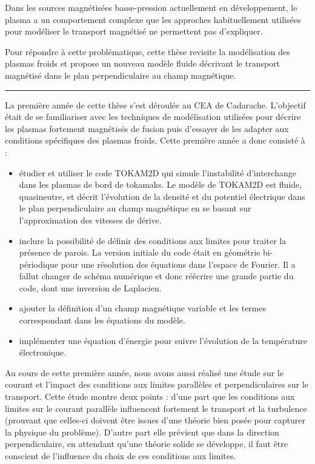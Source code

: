 Dans les sources magnétisées basse-pression actuellement en
développement, le plasma a un comportement complexe que les
approches habituellement utilisées pour modéliser le transport
magnétisé ne permettent pas d'expliquer.

Pour répondre à cette problématique, cette thèse revisite la modélisation
des plasmas froids et propose un nouveau modèle fluide décrivant le transport
magnétisé dans le plan perpendiculaire au champ magnétique.

\begin{center}
\rule{0.6\textwidth}{1pt}
\end{center}

La première année de cette thèse s'est déroulée au CEA de Cadarache.
L'objectif était de se familiariser avec les techniques de modélisation
utilisées pour décrire les plasmas fortement magnétisés de fusion puis d'essayer
de les adapter aux conditions spécifiques des plasmas froids. Cette première
année a donc consisté à :

\begin{itemize}
  \item étudier et utiliser le code TOKAM2D qui simule
  l'instabilité d'interchange dans les plasmas de bord de tokamaks. Le 
  modèle de TOKAM2D est fluide, quasineutre, et décrit l'évolution de la
  densité et du potentiel électrique dans le plan perpendiculaire au champ
  magnétique en se basant sur l'approximation des vitesses de dérive.
  \item inclure la possibilité de définir des conditions aux limites pour
  traiter la présence de parois.
  La version initiale du code était en géométrie bi-périodique pour une résolution des
  équations dans l'espace de Fourier. Il a fallut changer de schéma
  numérique et donc réécrire une grande partie du code, dont une inversion de
  Laplacien.
  \item ajouter la définition d'un champ magnétique
  variable et les termes correspondant dans les équations du modèle.
  \item implémenter une équation d'énergie pour suivre l'évolution de la
  température électronique.
\end{itemize} 
 
 Au cours de cette première année, nous avons aussi réalisé une étude sur le
 courant et l'impact des conditions aux limites parallèles et perpendiculaires sur le
 transport. Cette étude montre deux points : d'une part que les conditions aux
 limites sur le courant parallèle influencent fortement le transport et la
 turbulence (prouvant que celles-ci doivent être issues d'une
 théorie bien posée pour capturer la physique du problème). D'autre part elle
 prévient que dans la direction perpendiculaire, en attendant qu'une théorie
 solide se développe, il faut être conscient de l'influence du choix de ces
 conditions aux limites.
	
